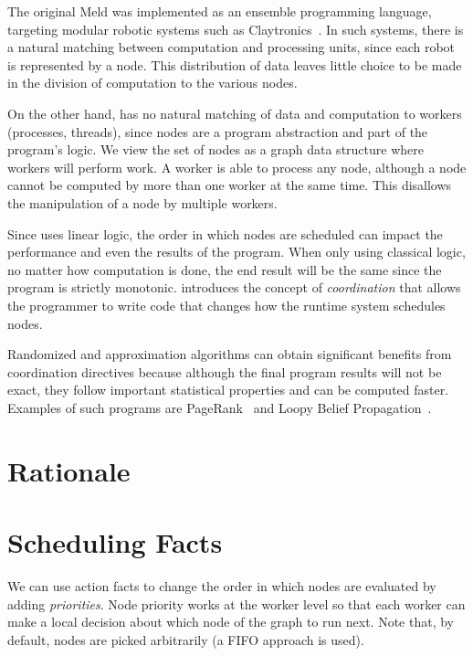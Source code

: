 The original Meld was
implemented as an ensemble programming language, targeting modular robotic systems such as
Claytronics~\cite{ashley-rollman-derosa-iros07wksp}. In such systems, there is a natural matching
between computation and processing units, since each robot is represented by a node. This distribution
of data leaves little choice to be made in the division of computation to the various nodes.

On the other hand, \lang has no natural matching of data and computation to workers (processes, threads),
since nodes are a program abstraction and part of the program's logic.
We view the set of nodes as a graph data structure where workers will perform work.
A worker is able to process any node, although a node cannot be computed by more than one worker
at the same time. This disallows the manipulation of a node by multiple workers.

Since \lang uses linear logic, the order in which nodes are scheduled can impact the
performance and even the results of the program. When only using
classical logic, no matter how computation is done, the end result will be the same since the program
is strictly monotonic.
\lang introduces the concept of \emph{coordination} that allows the programmer
to write code that changes how the runtime system schedules nodes.

Randomized and approximation
algorithms can obtain significant benefits from coordination directives because although the final
program results will not be exact, they follow important statistical properties and can be computed faster.
Examples of such programs are PageRank~\cite{Lubachevsky:1986:CAA:4904.4801} and
Loopy Belief Propagation~\cite{Gonzalez+al:aistats09paraml}.

\section{Rationale}


\section{Scheduling Facts}

We can use action facts to change the order in which nodes are evaluated by adding
\emph{priorities}. Node priority works at the worker level
so that each worker can make a local decision about which node of the graph to run next.
Note that, by default, nodes are picked arbitrarily (a FIFO approach is used).

